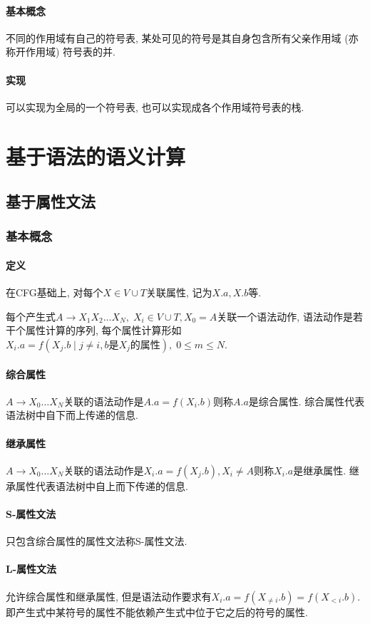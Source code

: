 \documentclass{ctexart}
\begin{document}
\paragraph{基本概念}
    不同的作用域有自己的符号表, 某处可见的符号是其自身包含所有父亲作用域 (亦称开作用域) 符号表的并.
\paragraph{实现} 可以实现为全局的一个符号表, 也可以实现成各个作用域符号表的栈.

\section{基于语法的语义计算}
\subsection{基于属性文法}
\subsubsection{基本概念}
\paragraph{定义}
    在CFG基础上, 对每个$X \in V \cup T$关联属性, 记为$X.a, X.b$等.\par
    每个产生式$A\to X_1 X_2 \ldots X_N,\; X_i \in V \cup T, X_0 = A$关联一个语法动作,
    语法动作是若干个属性计算的序列, 每个属性计算形如$X_i.a = f(X_j.b \;|\; j \neq i, b\text{是}X_j\text{的属性}),\; 0 \le m \le N$.
\paragraph{综合属性} $A \to X_0 \ldots X_N$关联的语法动作是$A.a = f(X_i.b)$则称$A.a$是综合属性.
    综合属性代表语法树中自下而上传递的信息.
\paragraph{继承属性} $A \to X_0 \ldots X_N$关联的语法动作是$X_i.a = f(X_j.b),X_i \neq A$则称$X_i.a$是继承属性.
    继承属性代表语法树中自上而下传递的信息.
\paragraph{S-属性文法} 只包含综合属性的属性文法称S-属性文法.
\paragraph{L-属性文法} 允许综合属性和继承属性, 但是语法动作要求有$X_i.a = f(X_{\neq i}.b) =f(X_{< i}.b)$.
    即产生式中某符号的属性不能依赖产生式中位于它之后的符号的属性.
\end{document}
